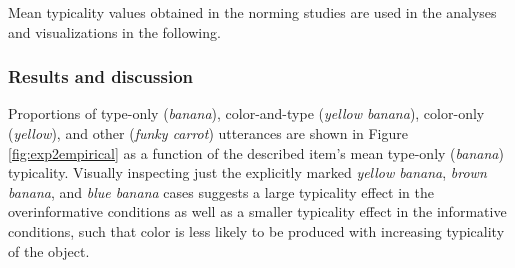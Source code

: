 \documentclass[11pt]{article}
\newcommand{\figref}[1]{Figure \ref{#1}}
\begin{document}
Mean typicality values obtained in the norming studies are used in the analyses and visualizations in the following.

\subsubsection{Results and discussion}

Proportions of type-only (\emph{banana}), color-and-type (\emph{yellow banana}), color-only (\emph{yellow}), and other (\emph{funky carrot}) utterances are shown in \figref{fig:exp2empirical} as a function of the described item's mean type-only (\emph{banana}) typicality. Visually inspecting just the explicitly marked \emph{yellow banana}, \emph{brown banana}, and \emph{blue banana} cases suggests a large typicality effect in the overinformative conditions as well as a smaller typicality effect in the informative conditions, such that color is less likely to be produced with increasing typicality of the object. 
\end{document}
